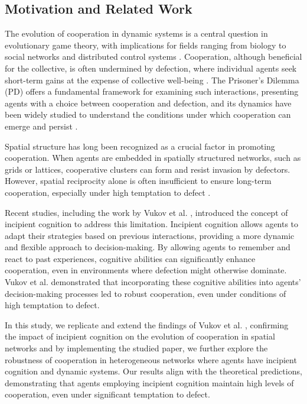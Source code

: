 \documentclass[runningheads]{llncs}
\begin{document}
\subsection{Motivation and Related Work}
The evolution of cooperation in dynamic systems is a central question in evolutionary
game theory, with implications for fields ranging from biology to social networks
and distributed control systems \cite{nowak2006}. Cooperation, although beneficial for the collective,
is often undermined by defection, where individual agents seek short-term gains at
the expense of collective well-being \cite{axelrod1981}. The Prisoner’s Dilemma (PD) offers a
fundamental framework for examining such interactions, presenting agents with a
choice between cooperation and defection, and its dynamics have been widely studied
to understand the conditions under which cooperation can emerge and persist \cite{nowak1992}.

Spatial structure has long been recognized as a crucial factor in promoting cooperation.
When agents are embedded in spatially structured networks, such as grids or lattices,
cooperative clusters can form and resist invasion by defectors. However, spatial
reciprocity alone is often insufficient to ensure long-term cooperation, especially
under high temptation to defect \cite{nowak1992,szabo2007}.


Recent studies, including the work by Vukov et al. \cite{vukov}, introduced the concept of incipient
cognition to address this limitation.
Incipient cognition allows agents to adapt their strategies based on previous
interactions, providing a more dynamic and flexible approach to decision-making.
By allowing agents to remember and react to past experiences, cognitive abilities
can significantly enhance cooperation, even in environments where defection might
otherwise dominate. Vukov et al. demonstrated that incorporating these cognitive
abilities into agents' decision-making processes led to robust cooperation,
even under conditions of high temptation to defect.

In this study, we replicate and extend the findings of Vukov et al. \cite{vukov},
confirming the impact of incipient cognition on the evolution of cooperation in
spatial networks and by implementing the studied paper, we further explore the
robustness of cooperation in heterogeneous networks where agents have incipient cognition
and dynamic systems.
Our results align with the theoretical predictions, demonstrating that agents
employing incipient cognition maintain high levels of cooperation, even under
significant temptation to defect.
\end{document}
